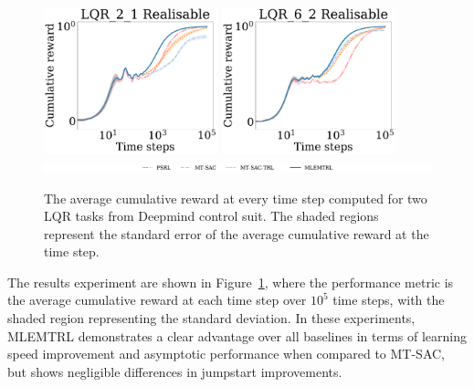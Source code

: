 \begin{figure}[t!]
    \centering
    \includegraphics[width=0.45\textwidth]{YourThesis/papers/transfer-learning/img/lqr_2_1_realisable.pdf} 
    \includegraphics[width=0.45\textwidth]{YourThesis/papers/transfer-learning/img/lqr_6_2_realisable.pdf}\\
    \includegraphics[width=\textwidth]{YourThesis/papers/transfer-learning/img/lqr_legend2.png}
    \caption{The average cumulative reward at every time step computed for two LQR tasks from Deepmind control suit. The shaded regions represent the standard error of the average cumulative reward at the time step.}\label{fig:thesis_full_results}%
\end{figure}

The results experiment are shown in Figure~\ref{fig:thesis_full_results}, where the performance metric is the average cumulative reward at each time step over $10^5$ time steps, with the shaded region representing the standard deviation. In these experiments, MLEMTRL demonstrates a clear advantage over all baselines in terms of learning speed improvement and asymptotic performance when compared to MT-SAC, but shows negligible differences in jumpstart improvements.

